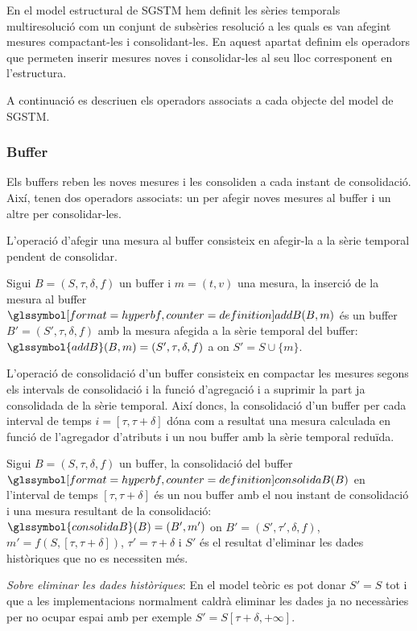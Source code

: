 En el model estructural de \gls{SGSTM} hem definit les sèries temporals
multiresolució com un conjunt de subsèries resolució a les quals es
van afegint mesures compactant-les i consolidant-les. En aquest
apartat definim els operadors que permeten inserir mesures noves i
consolidar-les al seu lloc corresponent en l'estructura.

A continuació es descriuen els operadors associats a cada objecte del
model de \gls{SGSTM}.


\subsubsection{Buffer}

Els buffers reben les noves mesures i les consoliden a cada instant de
consolidació. Així, tenen dos operadors associats: un per afegir noves
mesures al buffer i un altre per consolidar-les.


L'operació d'afegir una mesura al buffer consisteix en afegir-la a la
sèrie temporal pendent de consolidar.
\begin{definition}
  Sigui $B=(S,\tau,\delta,f)$ un buffer i $m=(t,v)$ una mesura, la
  inserció de la mesura al buffer $\glssymboldef{addB}(B,m)$ és un
  buffer $B'=(S',\tau,\delta,f)$ amb la mesura afegida a la sèrie
  temporal del buffer: $\glssymbol{addB}(B,m) = (S',\tau,\delta,f)$ a
  on $S'=S\cup \{m\}$.
\end{definition}


L'operació de consolidació d'un buffer consisteix en compactar les
mesures segons els intervals de consolidació i la funció d'agregació i
a suprimir la part ja consolidada de la sèrie temporal.  Així doncs,
la consolidació d'un buffer per cada interval de temps
$i=[\tau,\tau+\delta]$ dóna com a resultat una mesura calculada en
funció de l'agregador d'atributs i un nou buffer amb la sèrie temporal
reduïda.
\begin{definition}\label{def:model:consolidacio-buffer}
  Sigui $B=(S,\tau,\delta,f)$ un buffer, la consolidació del buffer
  $\glssymboldef{consolidaB}(B)$ en l'interval de temps
  $[\tau,\tau+\delta]$ és un nou buffer amb el nou instant de
  consolidació i una mesura resultant de la consolidació:
  $\glssymbol{consolidaB}(B) = (B',m')$ on $B'=(S',\tau',\delta,f)$,
  $m'=f(S,[\tau,\tau+\delta])$, $\tau'=\tau+\delta$ i $S'$ és el
  resultat d'eliminar les dades històriques que no es necessiten més.

  \emph{Sobre eliminar les dades històriques}: En el model teòric es
  pot donar $S'=S$ tot i que a les implementacions normalment caldrà
  eliminar les dades ja no necessàries per no ocupar espai amb per
  exemple $S'= S[\tau+\delta,+\infty]$.
\end{definition}


